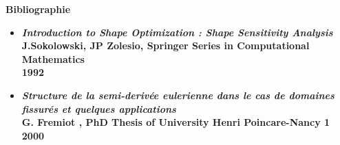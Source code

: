 \documentclass[11pt,a4paper]{article}
\begin{document}
\begin{center}
	\textbf{Bibliographie}
\end{center}



\begin{itemize}
	\item \textbf{\emph{Introduction to Shape Optimization : Shape Sensitivity Analysis} \\
		J.Sokolowski, JP Zolesio, Springer Series in Computational Mathematics \\
		1992} 
	
	\vspace{0cm}
	
	\item \textbf{\emph{Structure de la semi-derivée eulerienne dans le cas de domaines fissurés et quelques applications} \\
			G. Fremiot , PhD Thesis of University Henri Poincare-Nancy 1 \\
			2000
			}
	

\end{itemize}
	
	
\end{document}
